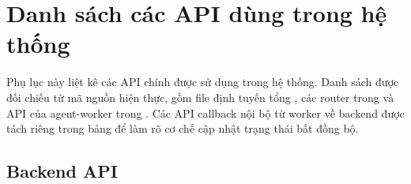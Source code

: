 \chapter{Danh sách các API dùng trong hệ thống}
\label{appendix:api_list}

Phụ lục này liệt kê các API chính được sử dụng trong hệ thống. Danh sách được đối chiếu từ mã nguồn hiện thực, gồm file định tuyến tổng , các router trong  và API của agent-worker trong . Các API callback nội bộ từ worker về backend được tách riêng trong bảng để làm rõ cơ chế cập nhật trạng thái bất đồng bộ.

\section{Backend API}

